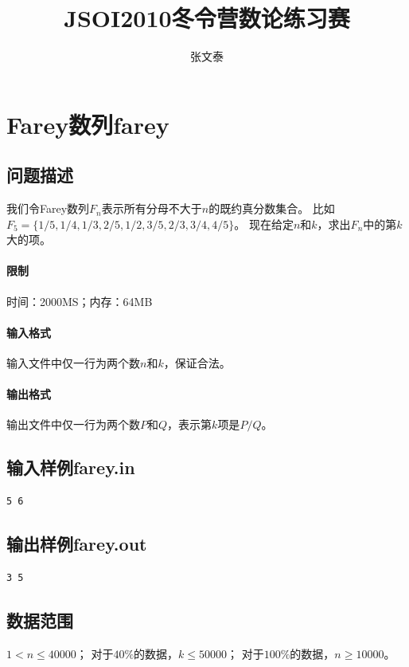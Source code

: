 \documentclass{ctexrep}
\begin{document}
\title{JSOI2010冬令营数论练习赛}
\author{张文泰}
\maketitle

\newpage
\section*{Farey数列farey}

\subsection*{问题描述}
我们令Farey数列$F_n$表示所有分母不大于$n$的既约真分数集合。
比如$F_5=\{1/5,1/4,1/3,2/5,1/2,3/5,2/3,3/4,4/5\}$。
现在给定$n$和$k$，求出$F_n$中的第$k$大的项。

\paragraph{限制} 时间：2000MS；内存：64MB

\paragraph{输入格式}
输入文件中仅一行为两个数$n$和$k$，保证合法。

\paragraph{输出格式}
输出文件中仅一行为两个数$P$和$Q$，表示第$k$项是$P/Q$。

\subsection*{输入样例farey.in}
\begin{verbatim}
5 6
\end{verbatim}

\subsection*{输出样例farey.out}
\begin{verbatim}
3 5
\end{verbatim}

\subsection*{数据范围}
$1<n\leq 40000$；
对于$40\%$的数据，$k\leq 50000$；
对于$100\%$的数据，$n\geq 10000$。
\end{document}
